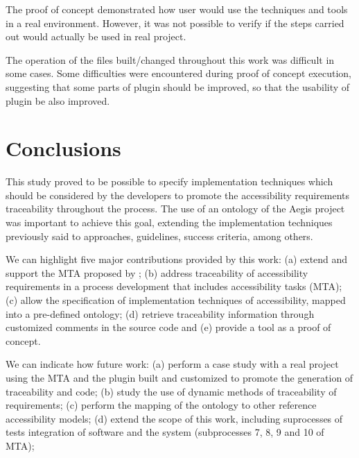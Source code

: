 \documentclass[10pt, conference, compsocconf]{IEEEtran}
\begin{document}
The proof of concept demonstrated how user would use the
techniques and tools in a real environment. However, it was not possible to verify
if the steps carried out would actually be used in real project.

The operation of the files built/changed throughout this work was
difficult in some cases. Some difficulties were encountered during proof of concept execution, 
suggesting that some parts of plugin should be improved, so that the usability of
plugin be also improved.



\section{Conclusions}

This study proved to be possible to specify implementation techniques which should
be considered by the developers to promote the accessibility requirements traceability throughout the process. 
The use of an ontology of the Aegis project \cite{aegis:13} was important to achieve this goal, extending the
implementation techniques previously said to approaches, guidelines, success criteria, among others.


We can highlight five major contributions provided by this
work: (a) extend and support the MTA proposed by \cite{maia:10}; (b) address traceability of accessibility requirements in a process
   development that includes accessibility tasks (MTA); (c) allow the specification of implementation techniques of accessibility,
   mapped into a pre-defined ontology; (d) retrieve traceability information through customized comments in the source code and (e) 
provide a tool as a proof of concept.
   

We can indicate how future work: (a) perform a case study with a real project using the MTA and the plugin
   built and customized to promote the generation of traceability and code; (b) study the use of dynamic methods of
   traceability of requirements; (c) perform the mapping of the ontology to other reference
   accessibility models; (d) extend the scope of this work, including suprocesses of tests
   integration of software and the system (subprocesses 7, 8, 9 and 10 of
   MTA);


\end{document}
